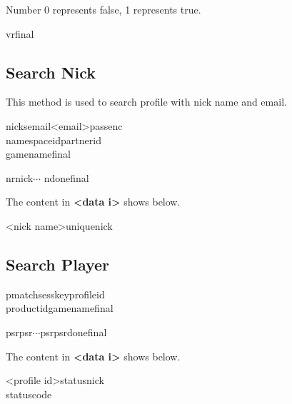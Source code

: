 \documentclass[oneside,titlepage,a4paper]{Definition/retrospy} %
\begin{document}
Number 0 represents false, 1 represents true.
\begin{mybox}
	\tbs vr\tbs <valid code: 0 or 1>\tbs final \tbs
\end{mybox}

\subsection{Search Nick}
This method is used to search profile with nick name and email.
\ClientRequest

\begin{mybox}
	\tbs nicks\tbs\tbs email\tbs <email>\tbs passenc\tbs<encrypted password>\\\tbs namespaceid\tbs <namespace id>\tbs partnerid\tbs<partner id>\\\tbs gamename\tbs<game name>\tbs final\tbs
\end{mybox}

\ServerResponse

\begin{mybox}
	\tbs nr\tbs\tbs nick\tbs<data 1>\tbs<data 2>\tbs $\cdots$\tbs <data n> \tbs ndone\tbs final\tbs
\end{mybox}
The content in \textbf{<data i>} shows below.
\begin{mybox}
	 <nick name>\tbs uniquenick \tbs<unique nick>
\end{mybox}

\subsection{Search Player}

\ClientRequest

\begin{mybox}
	\tbs pmatch\tbs\tbs sesskey\tbs<session key>\tbs profileid\tbs<profile id>\\\tbs productid\tbs <product id>\tbs gamename\tbs <game name>\tbs final\tbs
\end{mybox}

\ServerResponse
\begin{mybox}
	\tbs psr\tbs <data 1>\tbs psr\tbs<data 2>\tbs $\cdots$\tbs psr\tbs <data n>\tbs psrdone\tbs final\tbs
\end{mybox}
The content in \textbf{<data i>} shows below.
\begin{mybox}
	<profile id>\tbs status\tbs<status string>\tbs nick\tbs<nick name>\\\tbs statuscode\tbs<status code>
\end{mybox}
\end{document}
